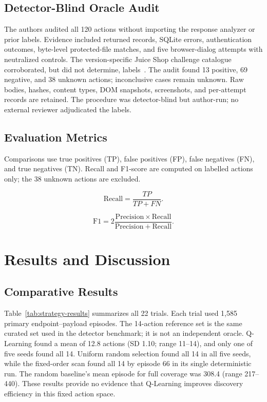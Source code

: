 \documentclass[conference, a4paper]{IEEEtran}
\begin{document}
\subsection{Detector-Blind Oracle Audit}

The authors audited all 120 actions without importing the response
analyzer or prior labels. Evidence included returned records, SQLite
errors, authentication outcomes, byte-level protected-file matches,
and five browser-dialog attempts with neutralized controls. The
version-specific Juice Shop challenge catalogue corroborated, but did
not determine, labels~\cite{juicechallenges}. The audit found 13
positive, 69 negative, and 38 unknown actions; inconclusive cases remain
unknown. Raw bodies, hashes, content types, DOM snapshots, screenshots,
and per-attempt records are retained. The procedure was detector-blind
but author-run; no external reviewer adjudicated the labels.

\subsection{Evaluation Metrics}

Comparisons use true positives (TP), false positives (FP), false
negatives (FN), and true negatives (TN). Recall and F1-score are
computed on labelled actions only; the 38 unknown actions are excluded.

\begin{equation}
\mathrm{Recall} = \frac{TP}{TP+FN}.
\label{eq:recall}
\end{equation}

\begin{equation}
\mathrm{F1} =
2\frac{\mathrm{Precision}\times\mathrm{Recall}}
{\mathrm{Precision}+\mathrm{Recall}}.
\label{eq:f1}
\end{equation}

\section{Results and Discussion}

\subsection{Comparative Results}

Table~\ref{tab:strategy-results} summarizes all 22 trials.
Each trial used 1,585 primary endpoint--payload episodes.
The 14-action reference set is the same curated set used in the
detector benchmark; it is not an independent oracle. Q-Learning
found a mean of 12.8 actions (SD 1.10; range 11--14), and only
one of five seeds found all 14. Uniform random selection found
all 14 in all five seeds, while the fixed-order scan found all
14 by episode 66 in its single deterministic run. The random
baseline's mean episode for full coverage was 308.4 (range
217--440). These results provide no evidence that Q-Learning
improves discovery efficiency in this fixed action space.
\end{document}
